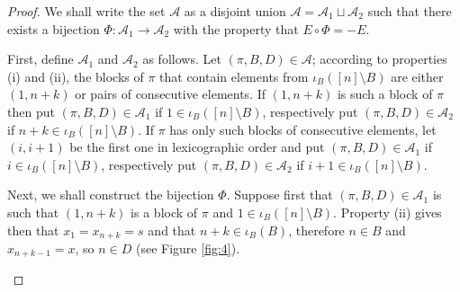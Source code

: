 \documentclass{amsart}
\begin{document}
\begin{proof}
  We shall write the set $ \mathcal{A} $ as a disjoint union 
  $ \mathcal{A} = \mathcal{A}_1 \sqcup \mathcal{A}_2 $ 
  such that there exists a  bijection $\Phi:\mathcal{A}_1\rightarrow \mathcal{A}_2 $
  with the property that
  $ E \circ \Phi = - E  $.
  
  First, define $ \mathcal{A}_1 $ and $\mathcal{A}_2$ as follows. 
  Let $ (\pi, B, D) \in \mathcal{A} $; according to properties (i) and (ii), the blocks of $\pi $ that contain elements from $ \iota_B([n]\setminus B )$
  are  either $(1, n+k)$ or pairs of consecutive elements. 
  If $ (1, n+k)$ is such a block of $\pi $ then put 
   $ (\pi, B, D) \in \mathcal{A}_1 $ 
   if 
   $ 1 \in \iota_B([n]\setminus B )$,
   respectively put
    $ (\pi, B, D) \in \mathcal{A}_2 $ 
    if
   $ n+k \in \iota_B([n]\setminus B )$.
  If $\pi $ has only such blocks of consecutive elements, let $(i, i+1) $ be the first one in lexicographic order and put
   $ (\pi, B, D) \in \mathcal{A}_1 $ 
   if
    $ i \in \iota_B([n]\setminus B)$, 
    respectively put
   $ (\pi, B, D) \in \mathcal{A}_2 $
   if $ i+1 \in \iota_B([n]\setminus B)$. 

  
  Next, we shall construct the bijection $\Phi$. Suppose first that 
  $(\pi, B, D)\in \mathcal{A}_1$
  is such that
  $(1, n+k)$ is a block of 
  $ \pi$
  and 
  $1 \in \iota_B([n]\setminus B)$. Property (ii) gives then that $ x_1 = x_{n+k}= s $ and that $ n+k \in \iota_B(B) $,
  therefore $ n \in B $ and $ x_{n+k-1}= x $, so $ n \in D $ (see Figure \ref{fig:4}).
  \begin{center}
  	{
  		\setlength{\intextsep}{-2pt}
\begin{figure}[H]
\end{figure}}
\end{center}
\end{proof}
\end{document}
